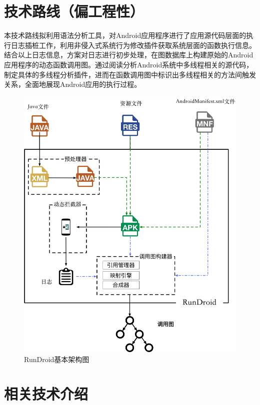 \section{技术路线（偏工程性）}
本技术路线拟利用语法分析工具，对Android应用程序进行了应用源代码层面的执行日志插桩工作，利用非侵入式系统行为修改插件获取系统层面的函数执行信息。结合以上日志信息，方案对日志进行初步处理，在图数据库上构建原始的Android应用程序的动态函数调用图。通过阅读分析Android系统中多线程相关的源代码，制定具体的多线程分析插件，进而在函数调用图中标识出多线程相关的方法间触发关系，全面地展现Android应用的执行过程。
 
 
\begin{figure}
\centering
\includegraphics[height=0.5\textheight]{./Figures/rundroid-overview.png}
\caption{ RunDroid基本架构图}
\label{fig:rundroid_overview}
\end{figure}


\section{相关技术介绍}

